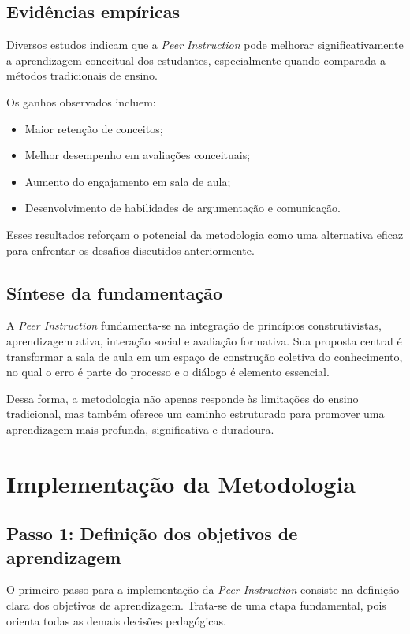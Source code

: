 \subsection{Evidências empíricas}

Diversos estudos indicam que a {\it Peer Instruction} pode melhorar significativamente a aprendizagem conceitual dos estudantes, especialmente quando comparada a métodos tradicionais de ensino.

Os ganhos observados incluem:

\begin{itemize}
    \item Maior retenção de conceitos;
    \item Melhor desempenho em avaliações conceituais;
    \item Aumento do engajamento em sala de aula;
    \item Desenvolvimento de habilidades de argumentação e comunicação.
\end{itemize}

Esses resultados reforçam o potencial da metodologia como uma alternativa eficaz para enfrentar os desafios discutidos anteriormente.

\subsection{Síntese da fundamentação}

A {\it Peer Instruction} fundamenta-se na integração de princípios construtivistas, aprendizagem ativa, interação social e avaliação formativa. Sua proposta central é transformar a sala de aula em um espaço de construção coletiva do conhecimento, no qual o erro é parte do processo e o diálogo é elemento essencial.

Dessa forma, a metodologia não apenas responde às limitações do ensino tradicional, mas também oferece um caminho estruturado para promover uma aprendizagem mais profunda, significativa e duradoura.

\section{Implementação da Metodologia}

\subsection{Passo 1: Definição dos objetivos de aprendizagem}

O primeiro passo para a implementação da {\it Peer Instruction} consiste na definição clara dos objetivos de aprendizagem. Trata-se de uma etapa fundamental, pois orienta todas as demais decisões pedagógicas.

